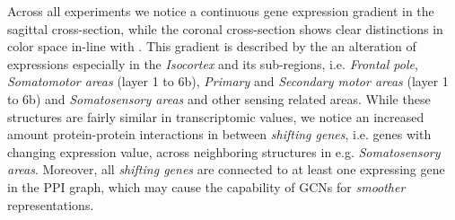 \documentclass[]{article}
\begin{document}
Across all experiments we notice a continuous gene expression gradient in the sagittal cross-section, while the coronal cross-section shows clear distinctions in color space in-line with \citet{Partel2020, sansom2009gradients}. This gradient is described by the an alteration of expressions especially in the \textit{Isocortex} and its sub-regions, i.e. \textit{Frontal pole}, \textit{Somatomotor areas} (layer 1 to 6b), \textit{Primary}  and \textit{Secondary motor areas} (layer 1 to 6b) and \textit{Somatosensory areas} and other sensing related areas. While these structures are fairly similar in transcriptomic values, we notice an increased amount protein-protein interactions in between \textit{shifting genes}, i.e. genes with changing expression value, across neighboring structures in e.g. \textit{Somatosensory areas}. Moreover, all \textit{shifting genes} are connected to at least one expressing gene in the PPI graph, which may cause the capability of GCNs for \textit{smoother} representations. \\
\end{document}
